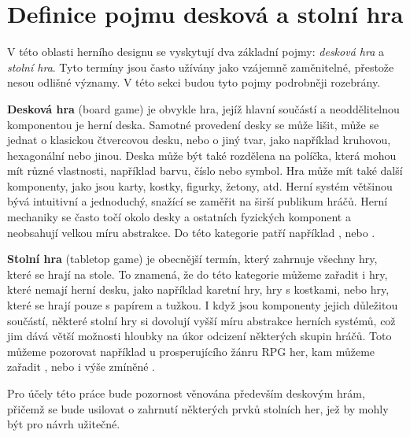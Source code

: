 \section{Definice pojmu desková a stolní hra}
\label{subsec:boardgame_definition}

V této oblasti herního designu se vyskytují dva základní pojmy: \textit{desková hra} a \textit{stolní hra}. Tyto termíny jsou často užívány jako vzájemně zaměnitelné, přestože nesou odlišné významy. V této sekci budou tyto pojmy podrobněji rozebrány.

\textbf{Desková hra} (board game) je obvykle hra, jejíž hlavní součástí a neoddělitelnou komponentou je herní deska. Samotné provedení desky se může lišit, může se jednat o klasickou čtvercovou desku, nebo o jiný tvar, jako například kruhovou, hexagonální nebo jinou. Deska může být také rozdělena na políčka, která mohou mít různé vlastnosti, například barvu, číslo nebo symbol. Hra může mít také další komponenty, jako jsou karty, kostky, figurky, žetony, atd. Herní systém většinou bývá intuitivní a jednoduchý, snažící se zaměřit na širší publikum hráčů. Herní mechaniky se často točí okolo desky a ostatních fyzických komponent a neobsahují velkou míru abstrakce. Do této kategorie patří například ,  nebo . \cite{board_game_supply_2023}

\textbf{Stolní hra} (tabletop game) je obecnější termín, který zahrnuje všechny hry, které se hrají na stole. To znamená, že do této kategorie můžeme zařadit i hry, které nemají herní desku, jako například karetní hry, hry s kostkami, nebo hry, které se hrají pouze s papírem a tužkou. I když jsou komponenty jejich důležitou součástí, některé stolní hry si dovolují vyšší míru abstrakce herních systémů, což jim dává větší možnosti hloubky na úkor odcizení některých skupin hráčů. Toto můžeme pozorovat například u prosperujícího žánru RPG her, kam můžeme zařadit ,  nebo i výše zmíněné . \cite{board_game_supply_2023}

Pro účely této práce bude pozornost věnována především deskovým hrám, přičemž se bude usilovat o zahrnutí některých prvků stolních her, jež by mohly být pro návrh užitečné.
